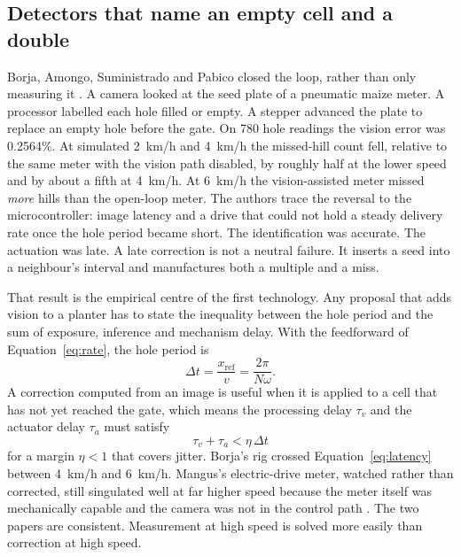 \subsection{Detectors that name an empty cell and a double}

Borja, Amongo, Suministrado and Pabico closed the loop, rather than only measuring it \cite{borja2018,borja2021}. A camera looked at the seed plate of a pneumatic maize meter. A processor labelled each hole filled or empty. A stepper advanced the plate to replace an empty hole before the gate. On \num{780} hole readings the vision error was \num{0.2564}\%. At simulated \SI{2}{km/h} and \SI{4}{km/h} the missed-hill count fell, relative to the same meter with the vision path disabled, by roughly half at the lower speed and by about a fifth at \SI{4}{km/h}. At \SI{6}{km/h} the vision-assisted meter missed \emph{more} hills than the open-loop meter. The authors trace the reversal to the microcontroller: image latency and a drive that could not hold a steady delivery rate once the hole period became short. The identification was accurate. The actuation was late. A late correction is not a neutral failure. It inserts a seed into a neighbour's interval and manufactures both a multiple and a miss.

That result is the empirical centre of the first technology. Any proposal that adds vision to a planter has to state the inequality between the hole period and the sum of exposure, inference and mechanism delay. With the feedforward of Equation~\eqref{eq:rate}, the hole period is
\begin{equation}
\label{eq:period}
\Delta t = \frac{x_{\mathrm{ref}}}{v} = \frac{2\pi}{N\omega}.
\end{equation}
A correction computed from an image is useful when it is applied to a cell that has not yet reached the gate, which means the processing delay \(\tau_v\) and the actuator delay \(\tau_a\) must satisfy
\begin{equation}
\label{eq:latency}
\tau_v + \tau_a < \eta\, \Delta t
\end{equation}
for a margin \(\eta < 1\) that covers jitter. Borja's rig crossed Equation~\eqref{eq:latency} between \SI{4}{km/h} and \SI{6}{km/h}. Mangus's electric-drive meter, watched rather than corrected, still singulated well at far higher speed because the meter itself was mechanically capable and the camera was not in the control path \cite{mangus2017}. The two papers are consistent. Measurement at high speed is solved more easily than correction at high speed.

